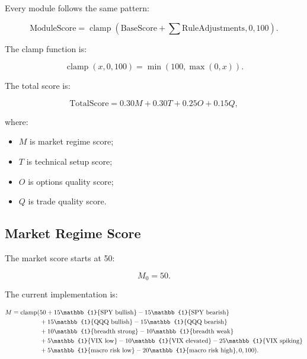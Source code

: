 \documentclass[11pt]{article}
\newcommand{\indicator}[1]{\mathbb{1}\{#1\}}
\newcommand{\clamp}{\operatorname{clamp}}
\begin{document}
Every module follows the same pattern:

\begin{equation}
\text{ModuleScore} = \clamp(\text{BaseScore} + \sum \text{RuleAdjustments}, 0, 100).
\end{equation}

The clamp function is:

\begin{equation}
\clamp(x, 0, 100) = \min(100, \max(0, x)).
\end{equation}

The total score is:

\begin{equation}
\text{TotalScore}
= 0.30M + 0.30T + 0.25O + 0.15Q,
\end{equation}

where:

\begin{itemize}[noitemsep]
  \item \(M\) is market regime score;
  \item \(T\) is technical setup score;
  \item \(O\) is options quality score;
  \item \(Q\) is trade quality score.
\end{itemize}

\subsection{Market Regime Score}

The market score starts at 50:

\begin{equation}
M_0 = 50.
\end{equation}

The current implementation is:

\begin{align}
M = \clamp(&50
 + 15\indicator{\text{SPY bullish}}
 - 15\indicator{\text{SPY bearish}} \notag \\
&+ 15\indicator{\text{QQQ bullish}}
 - 15\indicator{\text{QQQ bearish}} \notag \\
&+ 10\indicator{\text{breadth strong}}
 - 10\indicator{\text{breadth weak}} \notag \\
&+ 5\indicator{\text{VIX low}}
 - 10\indicator{\text{VIX elevated}}
 - 25\indicator{\text{VIX spiking}} \notag \\
&+ 5\indicator{\text{macro risk low}}
 - 20\indicator{\text{macro risk high}},
0,100).
\end{align}
\end{document}
